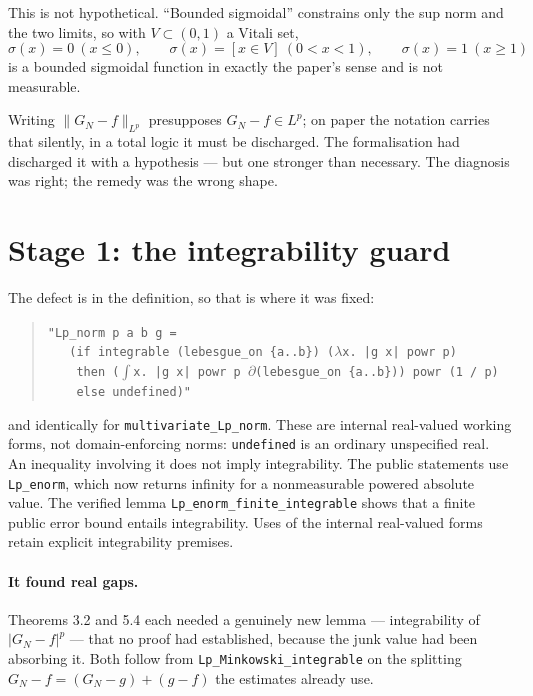 \documentclass[11pt,a4paper]{article}
\newcommand{\Lp}{L^{p}}
\newcommand{\isa}[1]{\texttt{#1}}
\begin{document}
This is not hypothetical. ``Bounded sigmoidal'' constrains only the sup norm and the two
limits, so with $V\subset(0,1)$ a Vitali set,
\[
  \sigma(x)=0\ (x\le 0),\qquad
  \sigma(x)=[x\in V]\ (0<x<1),\qquad
  \sigma(x)=1\ (x\ge 1)
\]
is a bounded sigmoidal function in exactly the paper's sense and is not measurable.

Writing $\|G_N-f\|_{\Lp}$ presupposes $G_N-f\in\Lp$; on paper the notation carries that
silently, in a total logic it must be discharged. The formalisation had discharged it with a
hypothesis --- but one stronger than necessary. The diagnosis was right; the remedy was the
wrong shape.

\section{Stage 1: the integrability guard}

The defect is in the definition, so that is where it was fixed:

\begin{quote}
\isa{"Lp\_norm p a b g =}\\
\isa{~~~(if integrable (lebesgue\_on \{a..b\}) (\(\lambda\)x. |g x| powr p)}\\
\isa{~~~~then (\(\int\)x. |g x| powr p \(\partial\)(lebesgue\_on \{a..b\})) powr (1 / p)}\\
\isa{~~~~else undefined)"}
\end{quote}

and identically for \isa{multivariate\_Lp\_norm}. These are internal real-valued working
forms, not domain-enforcing norms: \isa{undefined} is an ordinary unspecified real.
An inequality involving it does not imply integrability. The public statements use
\isa{Lp\_enorm}, which now returns infinity for a nonmeasurable powered absolute value.
The verified lemma \isa{Lp\_enorm\_finite\_integrable} shows that a finite public error
bound entails integrability. Uses of the internal real-valued forms retain explicit
integrability premises.

\paragraph{It found real gaps.} Theorems 3.2 and 5.4 each needed a genuinely new lemma ---
integrability of $|G_N-f|^p$ --- that no proof had established, because the junk value had been
absorbing it. Both follow from \isa{Lp\_Minkowski\_integrable} on the splitting
$G_N-f=(G_N-g)+(g-f)$ the estimates already use.
\end{document}
